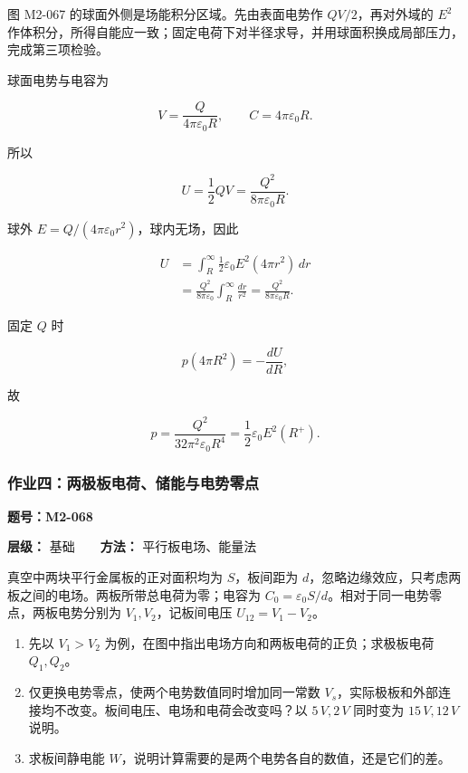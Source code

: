 图 M2-067 的球面外侧是场能积分区域。先由表面电势作 \(QV/2\)，再对外域的
\(E^2\)
作体积分，所得自能应一致；固定电荷下对半径求导，并用球面积换成局部压力，完成第三项检验。

球面电势与电容为

\[
V=\frac{Q}{4\pi\varepsilon_0R},
\qquad
C=4\pi\varepsilon_0R.
\]

所以

\[
U=\frac12QV
=\boxed{\frac{Q^2}{8\pi\varepsilon_0R}}.
\]

球外 \(E=Q/(4\pi\varepsilon_0r^2)\)，球内无场，因此

\[
\begin{aligned}
U
&=\int_R^{\infty}\frac12\varepsilon_0E^2(4\pi r^2)\,dr\\
&=\frac{Q^2}{8\pi\varepsilon_0}
\int_R^{\infty}\frac{dr}{r^2}
=\frac{Q^2}{8\pi\varepsilon_0R}.
\end{aligned}
\]

固定 \(Q\) 时

\[
p(4\pi R^2)=-\frac{dU}{dR},
\]

故

\[
\boxed{p=\frac{Q^2}{32\pi^2\varepsilon_0R^4}}
=\frac12\varepsilon_0E^2(R^+).
\]

\subsubsection{作业四：两极板电荷、储能与电势零点}\label{m2:ux4f5cux4e1aux56dbux4e24ux6781ux677fux7535ux8377ux50a8ux80fdux4e0eux7535ux52bfux96f6ux70b9}

\textbf{题号：M2-068}

\textbf{层级：} 基础　　\textbf{方法：} 平行板电场、能量法

真空中两块平行金属板的正对面积均为 \(S\)，板间距为
\(d\)，忽略边缘效应，只考虑两板之间的电场。两板所带总电荷为零；电容为
\(C_0=\varepsilon_0S/d\)。相对于同一电势零点，两板电势分别为
\(V_1,V_2\)，记板间电压 \(U_{12}=V_1-V_2\)。

\begin{enumerate}
\def\labelenumi{(\arabic{enumi})}
\item
  先以 \(V_1>V_2\) 为例，在图中指出电场方向和两板电荷的正负；求极板电荷
  \(Q_1,Q_2\)。
\item
  仅更换电势零点，使两个电势数值同时增加同一常数
  \(V_s\)，实际极板和外部连接均不改变。板间电压、电场和电荷会改变吗？以
  \(5\,V,2\,V\) 同时变为 \(15\,V,12\,V\) 说明。
\item
  求板间静电能 \(W\)，说明计算需要的是两个电势各自的数值，还是它们的差。
\end{enumerate}

